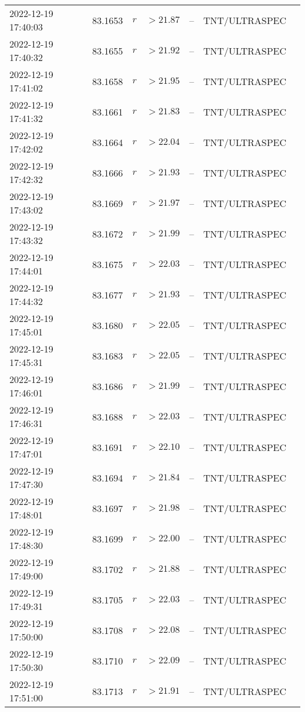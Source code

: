 \documentclass{nature_plusfigure}
\begin{document}
\begin{supplement}
\begin{center}
\begin{longtable}{lllllll}
2022-12-19 17:40:03 & 83.1653 & $r$ & $>21.87$ & -- & TNT/ULTRASPEC &  \\ 
2022-12-19 17:40:32 & 83.1655 & $r$ & $>21.92$ & -- & TNT/ULTRASPEC &  \\ 
2022-12-19 17:41:02 & 83.1658 & $r$ & $>21.95$ & -- & TNT/ULTRASPEC &  \\ 
2022-12-19 17:41:32 & 83.1661 & $r$ & $>21.83$ & -- & TNT/ULTRASPEC &  \\ 
2022-12-19 17:42:02 & 83.1664 & $r$ & $>22.04$ & -- & TNT/ULTRASPEC &  \\ 
2022-12-19 17:42:32 & 83.1666 & $r$ & $>21.93$ & -- & TNT/ULTRASPEC &  \\ 
2022-12-19 17:43:02 & 83.1669 & $r$ & $>21.97$ & -- & TNT/ULTRASPEC &  \\ 
2022-12-19 17:43:32 & 83.1672 & $r$ & $>21.99$ & -- & TNT/ULTRASPEC &  \\ 
2022-12-19 17:44:01 & 83.1675 & $r$ & $>22.03$ & -- & TNT/ULTRASPEC &  \\ 
2022-12-19 17:44:32 & 83.1677 & $r$ & $>21.93$ & -- & TNT/ULTRASPEC &  \\ 
2022-12-19 17:45:01 & 83.1680 & $r$ & $>22.05$ & -- & TNT/ULTRASPEC &  \\ 
2022-12-19 17:45:31 & 83.1683 & $r$ & $>22.05$ & -- & TNT/ULTRASPEC &  \\ 
2022-12-19 17:46:01 & 83.1686 & $r$ & $>21.99$ & -- & TNT/ULTRASPEC &  \\ 
2022-12-19 17:46:31 & 83.1688 & $r$ & $>22.03$ & -- & TNT/ULTRASPEC &  \\ 
2022-12-19 17:47:01 & 83.1691 & $r$ & $>22.10$ & -- & TNT/ULTRASPEC &  \\ 
2022-12-19 17:47:30 & 83.1694 & $r$ & $>21.84$ & -- & TNT/ULTRASPEC &  \\ 
2022-12-19 17:48:01 & 83.1697 & $r$ & $>21.98$ & -- & TNT/ULTRASPEC &  \\ 
2022-12-19 17:48:30 & 83.1699 & $r$ & $>22.00$ & -- & TNT/ULTRASPEC &  \\ 
2022-12-19 17:49:00 & 83.1702 & $r$ & $>21.88$ & -- & TNT/ULTRASPEC &  \\ 
2022-12-19 17:49:31 & 83.1705 & $r$ & $>22.03$ & -- & TNT/ULTRASPEC &  \\ 
2022-12-19 17:50:00 & 83.1708 & $r$ & $>22.08$ & -- & TNT/ULTRASPEC &  \\ 
2022-12-19 17:50:30 & 83.1710 & $r$ & $>22.09$ & -- & TNT/ULTRASPEC &  \\ 
2022-12-19 17:51:00 & 83.1713 & $r$ & $>21.91$ & -- & TNT/ULTRASPEC &  \\ 

\end{longtable}
\end{center}
\end{supplement}
\end{document}
